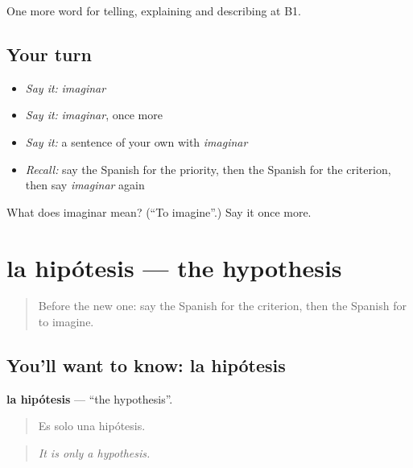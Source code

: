 \begin{grammarlens}[title={What you've built}]
One more word for telling, explaining and describing at B1.
\end{grammarlens}

\subsection*{Your turn}
\begin{itemize}
\raggedright
  \item \emph{Say it:} \emph{imaginar}
  \item \emph{Say it:} \emph{imaginar}, once more
  \item \emph{Say it:} a sentence of your own with \emph{imaginar}
  \item \emph{Recall:} say the Spanish for the priority, then the Spanish for the criterion, then say \emph{imaginar} again
\end{itemize}

\begin{tcolorbox}[breakable,colback=teal!4,colframe=teal!35!black,title={Before you move on}]
What does imaginar mean? (\textquotedblleft{}To imagine\textquotedblright{}.) Say it once more.
\end{tcolorbox}
\section[la hipótesis]{la hipótesis — the hypothesis}

\label{lesson:ES-C618-hipotesis}



\begin{quote}
Before the new one: say the Spanish for the criterion, then the Spanish for to imagine.
\end{quote}

\subsection*{You'll want to know: la hipótesis}
\textbf{la hipótesis} — \textquotedblleft{}the hypothesis\textquotedblright{}.

\begin{quote}
Es solo una hipótesis.
\end{quote}

\begin{quote}
\emph{It is only a hypothesis.}
\end{quote}

